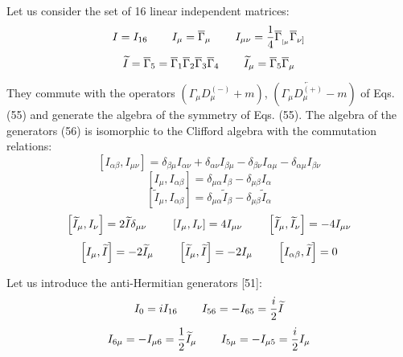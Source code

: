 \documentclass[a4paper,12pt]{article}
\begin{document}
Let us consider the set of 16 linear independent matrices:
\[
I=I_{16}\hspace{0.3in}I_\mu =\overline{\Gamma }_\mu \hspace{0.3in}
I_{\mu \nu }=\frac 14\overline{\Gamma }_{_{[\mu }}\overline{\Gamma
} _{\nu ]}
\]
\begin{equation}
\widetilde{I}=\overline{\Gamma }_5=\overline{\Gamma
}_1\overline{\Gamma }_2 \overline{\Gamma }_3\overline{\Gamma
}_4\hspace{0.3in}\widetilde{I} _\mu =\overline{\Gamma
}_5\overline{\Gamma }_\mu  \label{56}
\end{equation}

They commute with the operators $\left( \Gamma _\mu D_\mu ^{(-)}+m\right) $,
$\left( \Gamma _\mu \overleftarrow{D_\mu ^{(+)}}-m\right) $ of Eqs. (55) and
generate the algebra of the symmetry of Eqs. (55). The algebra of the
generators (56) is isomorphic to the Clifford algebra with the commutation
relations:
\[
\left[ I_{\alpha \beta },I_{\mu \nu }\right] =\delta _{\beta \mu }I_{\alpha
\nu }+\delta _{\alpha \nu }I_{\beta \mu }-\delta _{\beta \nu }I_{\alpha \mu
}-\delta _{\alpha \mu }I_{\beta \nu }
\]
\[
\left[ I_\mu ,I_{\alpha \beta }\right] =\delta _{\mu \alpha }I_\beta -\delta
_{\mu \beta }I_\alpha
\]
\[
\left[ \widetilde{I}_\mu ,I_{\alpha \beta }\right] =\delta _{\mu
\alpha } \widetilde{I}_\beta -\delta _{\mu \beta
}\widetilde{I}_\alpha
\]
\[
\left[ \widetilde{I}_\mu ,I_\nu \right] =2\widetilde{I}\delta
_{\mu \nu } \hspace{0.3in}\left[ I_\mu ,I_\nu \right] =4I_{\mu \nu
}\hspace{0.3in}\left[ \widetilde{I}_\mu ,\widetilde{I}_\nu \right]
=-4I_{\mu \nu }
\]
\begin{equation}
\left[ I_\mu ,\widetilde{I}\right] =-2\widetilde{I}_\mu \hspace{0.3in}\left[
\widetilde{I}_\mu ,\widetilde{I}\right] =-2I_\mu \hspace{0.3in}\left[
I_{\alpha \beta },\widetilde{I}\right] =0  \label{57}
\end{equation}

Let us introduce the anti-Hermitian generators [51]:
\[
I_0=iI_{16}\hspace{0.3in}I_{56}=-I_{65}=\frac i2\widetilde{I}
\]
\begin{equation}
I_{6\mu }=-I_{\mu 6}=\frac 12\widetilde{I}_\mu \hspace{0.3in}I_{5\mu
}=-I_{\mu 5}=\frac i2I_\mu  \label{58}
\end{equation}
\end{document}
